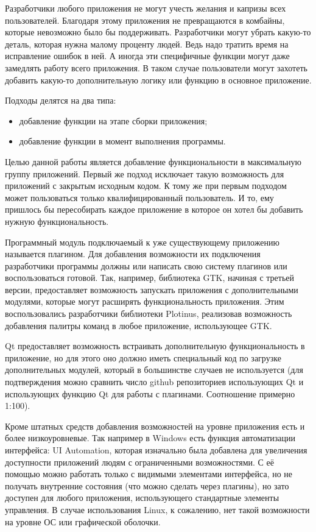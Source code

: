 Разработчики любого приложения не могут учесть желания и капризы всех
пользователей. Благодаря этому приложения не превращаются в комбайны, которые
невозможно было бы поддерживать. Разработчики могут убрать какую-то деталь,
которая нужна малому проценту людей. Ведь надо тратить время на исправление
ошибок в ней. А иногда эти специфичные функции могут даже замедлять работу всего
приложения. В таком случае пользователи могут захотеть добавить какую-то
дополнительную логику или функцию в основное приложение.

Подходы делятся на два типа:
\begin{itemize}
	\item добавление функции на этапе сборки приложения;
	\item добавление функции в момент выполнения программы.
\end{itemize}

Целью данной работы является добавление функциональности в максимальную группу
приложений. Первый же подход исключает такую возможность для приложений с
закрытым исходным кодом. К тому же при первым подходом может пользоваться только
квалифицированный пользователь. И то, ему пришлось бы пересобирать каждое
приложение в которое он хотел бы добавить нужную функциональность.

Программный модуль подключаемый к уже существующему приложению называется
плагином. Для добавления возможности их подключения разработчики программы
должны или написать свою систему плагинов или воспользоваться готовой. Так,
например, библиотека GTK, начиная с третьей версии, предоставляет возможность
запускать приложения с дополнительными модулями, которые могут расширять
функциональность приложения. Этим воспользовались разработчики библиотеки
Plotinus, реализовав возможность добавления палитры команд в любое приложение,
использующее GTK.

Qt предоставляет возможность встраивать дополнительную функциональность в
приложение, но для этого оно должно иметь специальный код по загрузке
дополнительных модулей, который в большинстве случаев не используется (для
подтверждения можно сравнить число github репозиториев использующих
Qt\cite{githubqt} и использующих функцию Qt для работы с
плагинами\cite{githubqpluginloader}. Соотношение примерно 1:100).

Кроме штатных средств добавления возможностей на уровне приложения есть и более
низкоуровневые. Так например в Windows есть функция автоматизации интерфейса: UI
Automation\cite{windowsuiautomation}, которая изначально была добавлена для
увеличения доступности приложений людям с ограниченными возможностями. С её
помощью можно работать только с видимыми элементами интерфейса, но не получать
внутренние состояния (что можно сделать через плагины), но зато доступен для
любого приложения, использующего стандартные элементы управления. В случае
использования Linux, к сожалению, нет такой возможности на уровне ОС или
графической оболочки.

